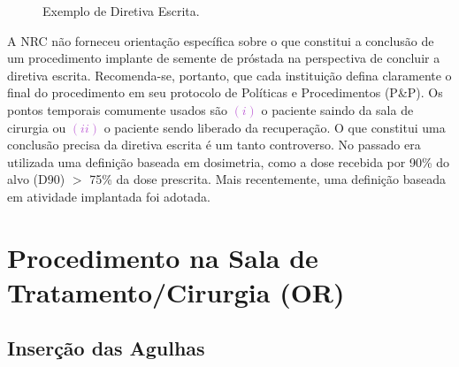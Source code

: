 \documentclass[11pt,a4paper]{article}
\begin{document}
	\begin{figure}[h]
		\centering
		\caption{Exemplo de Diretiva Escrita.}
		\label{fig:prescricaoErscrita}
	\end{figure}

	A NRC não forneceu orientação específica sobre o que constitui a conclusão de um procedimento implante de semente de próstada na perspectiva de concluir a diretiva escrita. Recomenda-se, portanto, que cada instituição defina claramente o final do procedimento em seu protocolo de Políticas e Procedimentos (P\&P). Os pontos temporais comumente usados são \textcolor{MediumOrchid}{$(i)$} o paciente saindo da sala de cirurgia ou \textcolor{MediumOrchid}{$(ii)$} o paciente sendo liberado da recuperação. O que constitui uma conclusão precisa da diretiva escrita é um tanto controverso. No passado era utilizada uma definição baseada em dosimetria, como a dose recebida por 90\% do alvo (D90) $>$ 75\% da dose prescrita. Mais recentemente, uma definição baseada em atividade implantada foi adotada.
	
\section{Procedimento na Sala de Tratamento/Cirurgia (OR)}

\subsection*{Inserção das Agulhas}
\end{document}
